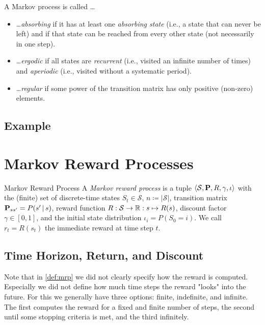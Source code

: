 		\begin{definition}
			A Markov process is called \dots
			\begin{itemize}
				\item \dots \emph{absorbing} if it has at least one \emph{absorbing state} (i.e., a state that can never be left) and if that state can be reached from every other state (not necessarily in one step).
				\item \dots \emph{ergodic} if all states are \emph{recurrent} (i.e., visited an infinite number of times) and \emph{aperiodic} (i.e., visited without a systematic period).
				\item \dots \emph{regular} if some power of the transition matrix has only positive (non-zero) elements.
			\end{itemize}
		\end{definition}

		\subsection{Example}

	\section{Markov Reward Processes}
		\begin{definition}{Markov Reward Process}  \label{def:mrp}
			A \emph{Markov reward process} is a tuple \( \langle \mathcal{S}, \bm{\mathrm{P}}, R, \gamma, \iota \rangle \) with the (finite) set of discrete-time states \(S_t \in \mathcal{S}\), \(n \coloneqq \lvert \mathcal{S} \rvert\), transition matrix \( \bm{\mathrm{P}}_{ss'} = P(s' \,\vert\, s) \), reward function \( R : \mathcal{S} \to \mathbb{R} : s \mapsto R(s) \), discount factor \( \gamma \in [0, 1] \), and the initial state distribution \( \iota_i = P(S_0 = i) \). We call \( r_t = R(s_t) \) the immediate reward at time step \(t\).
		\end{definition}

		\subsection{Time Horizon, Return, and Discount}
			Note that in \autoref{def:mrp} we did not clearly specify how the reward is computed. Especially we did not define how much time steps the reward "looks" into the future. For this we generally have three options: finite, indefinite, and infinite. The first computes the reward for a fixed and finite number of steps, the second until some stopping criteria is met, and the third infinitely.

